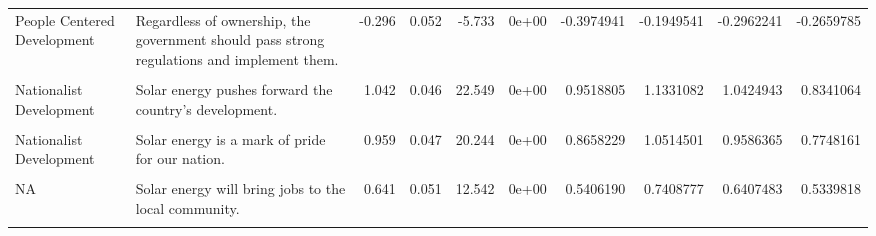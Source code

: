 \documentclass[
]{article}
\begin{document}
\begin{landscape}
\begin{table}[!h]
{\begin{tabular}[t]{l>{\raggedright\arraybackslash}p{4cm}rrrrrrrr}
\addlinespace
People Centered Development & Regardless of ownership, the government should pass strong regulations and implement them. & -0.296 & 0.052 & -5.733 & 0e+00 & -0.3974941 & -0.1949541 & -0.2962241 & -0.2659785\\
\cellcolor{gray!6}{Nationalist Development} & \cellcolor{gray!6}{MECHANISATION} & \cellcolor{gray!6}{-0.445} & \cellcolor{gray!6}{0.052} & \cellcolor{gray!6}{-8.501} & \cellcolor{gray!6}{0e+00} & \cellcolor{gray!6}{-0.5481301} & \cellcolor{gray!6}{-0.3427323} & \cellcolor{gray!6}{-0.4454312} & \cellcolor{gray!6}{-0.3859243}\\
Nationalist Development & Solar energy pushes forward the country's development. & 1.042 & 0.046 & 22.549 & 0e+00 & 0.9518805 & 1.1331082 & 1.0424943 & 0.8341064\\
\cellcolor{gray!6}{Nationalist Development} & \cellcolor{gray!6}{I would be proud if my community used solar energy} & \cellcolor{gray!6}{1.042} & \cellcolor{gray!6}{0.047} & \cellcolor{gray!6}{21.934} & \cellcolor{gray!6}{0e+00} & \cellcolor{gray!6}{0.9485906} & \cellcolor{gray!6}{1.1347564} & \cellcolor{gray!6}{1.0416735} & \cellcolor{gray!6}{0.8187225}\\
Nationalist Development & Solar energy is a mark of pride for our nation. & 0.959 & 0.047 & 20.244 & 0e+00 & 0.8658229 & 1.0514501 & 0.9586365 & 0.7748161\\
\addlinespace
\cellcolor{gray!6}{Nationalist Development} & \cellcolor{gray!6}{Solar energy brings economic prosperity to the surrounding regions.} & \cellcolor{gray!6}{0.980} & \cellcolor{gray!6}{0.047} & \cellcolor{gray!6}{20.803} & \cellcolor{gray!6}{0e+00} & \cellcolor{gray!6}{0.8876975} & \cellcolor{gray!6}{1.0723692} & \cellcolor{gray!6}{0.9800333} & \cellcolor{gray!6}{0.7896156}\\
NA & Solar energy will bring jobs to the local community. & 0.641 & 0.051 & 12.542 & 0e+00 & 0.5406190 & 0.7408777 & 0.6407483 & 0.5339818\\
\cellcolor{gray!6}{NA} & \cellcolor{gray!6}{Solar energy poses a great risk to the health of people living around it.} & \cellcolor{gray!6}{0.620} & \cellcolor{gray!6}{0.054} & \cellcolor{gray!6}{11.424} & \cellcolor{gray!6}{0e+00} & \cellcolor{gray!6}{0.5139817} & \cellcolor{gray!6}{0.7268665} & \cellcolor{gray!6}{0.6204241} & \cellcolor{gray!6}{0.3998333}\\
\bottomrule
\end{tabular}}
\end{table}
\end{landscape}
\end{document}

